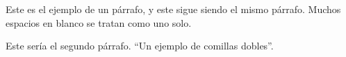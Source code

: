 \documentclass{article}
\begin{document}
Este es el ejemplo de un p\'arrafo,
y este sigue siendo el mismo p\'arrafo.
Muchos      espacios      en      blanco       se tratan como uno      solo.


Este ser\'ia el segundo p\'arrafo.
``Un ejemplo de comillas dobles''.
\end{document}
